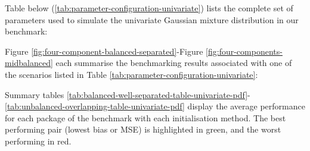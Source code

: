 Table below (\ref{tab:parameter-configuration-univariate}) lists the complete set of parameters used to simulate the univariate Gaussian mixture distribution in our benchmark:

\begin{table}[!h]

\caption{\label{tab:parameter-configuration-univariate}The 9 parameter configurations tested to generate the samples of the univariate experiment, with $k=4$ components.}
\centering
{}
\end{table}

Figure \ref{fig:four-component-balanced-separated}-Figure
\ref{fig:four-components-midbalanced} each summarise the benchmarking
results associated with one of the scenarios listed in Table
\ref{tab:parameter-configuration-univariate}:

Summary tables
\ref{tab:balanced-well-separated-table-univariate-pdf}-
\ref{tab:unbalanced-overlapping-table-univariate-pdf}
display the average performance for each package of the benchmark with
each initialisation method. The best performing pair (lowest bias or
MSE) is highlighted in green, and the worst performing in red.

